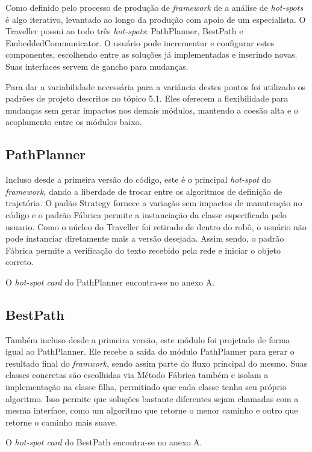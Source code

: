 Como definido pelo processo de produção de \textit{framework} de \cite{Fayad1999} a análise de \textit{hot-spots} é algo iterativo, levantado ao longo da produção com apoio de um especialista. O Traveller possui ao todo três \textit{hot-spots}: PathPlanner, BestPath e EmbeddedCommunicator. O usuário pode incrementar e configurar estes componentes, escolhendo entre as soluções já implementadas e inserindo novas. Suas interfaces servem de gancho para mudanças.

Para dar a variabilidade necessária para a variância destes pontos foi utilizado os padrões de projeto descritos no tópico 5.1. Eles oferecem a flexibilidade para mudanças sem gerar impactos nos demais módulos, mantendo a coesão alta e o acoplamento entre os módulos baixo.

\subsection{PathPlanner}

Incluso desde a primeira versão do código, este é o principal \textit{hot-spot} do \textit{framework}, dando a liberdade de trocar entre os algoritmos de definição de trajetória. O padão Strategy fornece a variação sem impactos de manutenção no código e o padrão Fábrica permite a instanciação da classe especificada pelo usuario. Como o núcleo do Traveller foi retirado de dentro do robô, o usuário não pode instanciar diretamente mais a versão desejada. Assim sendo, o padrão Fábrica permite a verificação do texto recebido pela rede e iniciar o objeto correto.

O \textit{hot-spot card} do PathPlanner encontra-se no anexo A.

\subsection{BestPath}

Também incluso desde a primeira versão, este módulo foi projetado de forma igual ao PathPlanner. Ele recebe a saída do módulo PathPlanner para gerar o resultado final do \textit{framwork}, sendo assim parte do fluxo principal do mesmo. Suas classes concretas são escolhidas via Método Fábrica também e isolam a implementação na classe filha, permitindo que cada classe tenha seu próprio algoritmo. Isso permite que soluções bastante diferentes sejam chamadas com a mesma interface, como um algoritmo que retorne o menor caminho e outro que retorne o caminho mais suave.

O \textit{hot-spot card} do BestPath encontra-se no anexo A.

